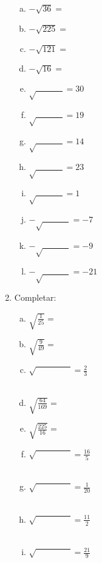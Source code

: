 \documentclass[a4paper,14pt]{article}
\begin{document}
\begin{multicols}{2}
\begin{enumerate}
\begin{enumerate}[a)]
        	\item $-\sqrt{36} = $
        	\item $-\sqrt{225} = $
        	\item $-\sqrt{121} = $
        	\item $-\sqrt{16} = $
        	\item $\sqrt{~~~~~~~~~~~~~~} = 30$
        	\item $\sqrt{~~~~~~~~~~~~~~} = 19$
        	\item $\sqrt{~~~~~~~~~~~~~~} = 14$
        	\item $\sqrt{~~~~~~~~~~~~~~} = 23$
        	\item $\sqrt{~~~~~~~~~~~~~~} = 1$
        	\item $-\sqrt{~~~~~~~~~~~~~~} = -7$
        	\item $-\sqrt{~~~~~~~~~~~~~~} = -9$
        	\item $-\sqrt{~~~~~~~~~~~~~~} = -21$
        \end{enumerate}
    	\item Completar:
    	\begin{enumerate}[a)]
    		\item $\sqrt{\frac{1}{25}} = $
    		\item $\sqrt{\frac{9}{49}} = $
    		\item $\sqrt{\phantom{6cm}~~~~~~~~~~} = \frac{2}{3}$
    		\\\\
    		\item $\sqrt{\frac{64}{169}} = $
    		\item $\sqrt{\frac{225}{16}} = $
    		\item $\sqrt{\phantom{6cm}~~~~~~~~~~} = \frac{16}{5}$
    		\\\\
    		\item $\sqrt{\phantom{6cm}~~~~~~~~~~} = \frac{1}{20}$
    		\\\\
    		\item $\sqrt{\phantom{6cm}~~~~~~~~~~} = \frac{11}{2}$
    		\\\\
    		\item $\sqrt{\phantom{6cm}~~~~~~~~~~} = \frac{21}{9}$
    		\\\\
    	\end{enumerate}
		
		
    \end{enumerate}        
    \end{multicols}    
\end{document}

